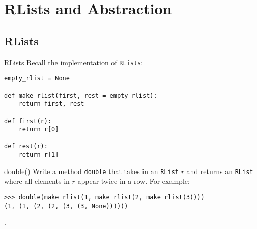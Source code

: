 \documentclass[9pt]{beamer}
\begin{document}
\section{RLists and Abstraction}
\subsection{RLists}
\begin{frame}[fragile]{RLists}
  Recall the implementation of {\tt RLists}:

  \begin{lstlisting}
empty_rlist = None

def make_rlist(first, rest = empty_rlist):
    return first, rest

def first(r):
    return r[0]

def rest(r):
    return r[1]
  \end{lstlisting}
\end{frame}



\begin{frame}[fragile]{double()}
  Write a method {\tt double} that takes in an {\tt RList} $r$ and returns
  an {\tt RList} where all elements in $r$ appear twice in a row. For
  example:

  \begin{lstlisting}[numbers=none, frame=none, xleftmargin=0pt]
>>> double(make_rlist(1, make_rlist(2, make_rlist(3))))
(1, (1, (2, (2, (3, (3, None))))))
  \end{lstlisting}

.  
\end{frame}
\end{document}
